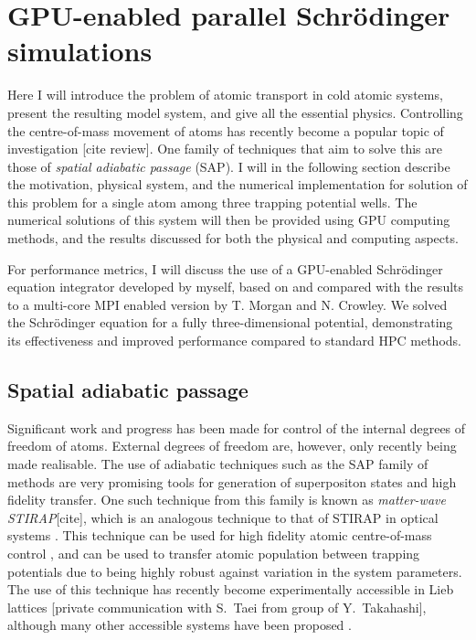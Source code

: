 \section{GPU-enabled parallel Schr\"odinger simulations}
\label{sec:3D Stirap parallel Schr\"odinger simulations}

Here I will introduce the problem of atomic transport in cold atomic systems, present the resulting model system, and give all the essential physics. Controlling the centre-of-mass movement of atoms has recently become a popular topic of investigation [cite review]. One family of techniques that aim to solve this are those of \textit{spatial adiabatic passage} (SAP). I will in the following section describe the motivation, physical system, and the numerical implementation for solution of this problem for a single atom among three trapping potential wells. The numerical solutions of this system will then be provided using GPU computing methods, and the results discussed for both the physical and computing aspects.

For performance metrics, I will discuss the use of a GPU-enabled Schr\"odinger equation integrator developed by myself, based on and compared with the results to a multi-core MPI enabled version by T. Morgan and N. Crowley. We solved the Schr\"odinger equation for a fully three-dimensional potential, demonstrating its effectiveness and improved performance compared to standard HPC methods.


\subsection{Spatial adiabatic passage}

Significant work and progress has been made for control of the internal degrees of freedom of atoms. External degrees of freedom are, however, only recently being made realisable. The use of adiabatic techniques such as the SAP family of methods are very promising tools for generation of superpositon states and high fidelity transfer. One such technique from this family is known as \textit{matter-wave STIRAP}[cite], which is an analogous technique to that of STIRAP in optical systems \cite{}. This technique can be used for high fidelity atomic centre-of-mass control \cite{Eckert:04}, and can be used to transfer atomic population between trapping potentials due to being highly robust against variation in the system parameters. The use of this technique has recently become experimentally accessible in Lieb lattices [private communication with S.~Taei from group of Y.~Takahashi], although many other accessible systems have been proposed \cite{Eckert:06,Morgan:11,Kohler:13}.


